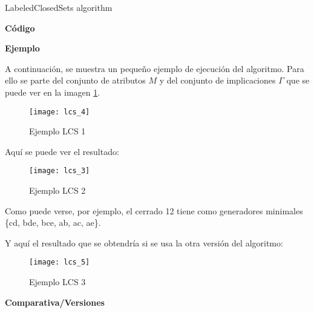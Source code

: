 \IncMargin{1em}
\begin{algorithm}[H]
    \SetAlgoLined
    \DontPrintSemicolon
    \caption{LabeledClosedSets algorithm}\label{alg:3}
\end{algorithm}\DecMargin{1em}
\newpage

\textbf{C\'odigo} 

\textbf{Ejemplo} 

A continuaci\'on, se muestra un peque\~no ejemplo de ejecuci\'on del algoritmo. Para ello se parte del conjunto de atributos \(M\) y del conjunto de implicaciones \(\Gamma\) que se puede ver en la imagen \ref{fig:lcs_4}.
\begin{figure}[H]
    \centering
    \texttt{[image: lcs\_4]}
    \caption{Ejemplo LCS 1}
    \label{fig:lcs_4}
\end{figure} 
\newpage
Aqu\'i se puede ver el resultado:
\begin{figure}[H]
    \centering
    \texttt{[image: lcs\_3]}
    \caption{Ejemplo LCS 2}
    \label{fig:lcs_3}
\end{figure}

Como puede verse, por ejemplo, el cerrado 12 tiene como generadores minimales \{cd, bde, bce, ab, ac, ae\}.

Y aqu\'i el resultado que se obtendr\'ia si se usa la otra versi\'on del algoritmo:
\begin{figure}[H]
    \centering
    \texttt{[image: lcs\_5]}
    \caption{Ejemplo LCS 3}
    \label{fig:lcs_5}
\end{figure}
\newpage
\textbf{Comparativa/Versiones} 